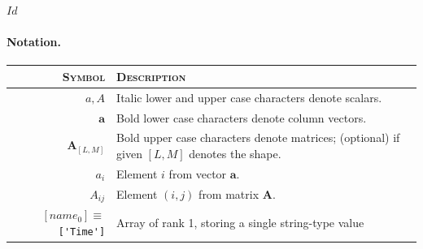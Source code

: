 \svnInfo $Id$

\paragraph{Notation.}

\begin{center}
  \begin{tabular}{rp{11cm}}
    \textsc{Symbol} & \textsc{Description} \\
    \hline
    $a, A$              & Italic lower and upper case characters denote scalars. \\
    $\mathbf{a}$        & Bold lower case characters denote column vectors. \\
    $\mathbf{A}_{[L,M]}$ & Bold upper case characters denote matrices; (optional)
    if given $[L,M]$ denotes the shape. \\
    $a_{i}$             & Element $i$ from vector $\mathbf{a}$. \\
    $A_{ij}$            & Element $(i,j)$ from matrix $\textbf{A}$. \\
    $[name_{0}] \equiv $ \small \verb|['Time']| & Array of rank 1, storing a
    single string-type value \\
    \hline
  \end{tabular}
\end{center}
